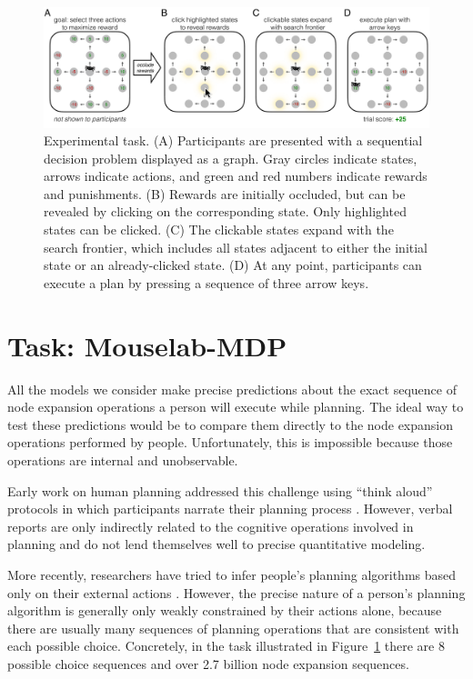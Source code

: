\begin{figure}[t!]
    \centering
    \includegraphics[width=\textwidth]{figs/planning/fig2.pdf}
    \caption{Experimental task.
    (A) Participants are presented with a sequential decision problem displayed as a graph. Gray circles indicate states, arrows indicate actions, and green and red numbers indicate rewards and punishments.
    (B) Rewards are initially occluded, but can be revealed by clicking on the corresponding state. Only highlighted states can be clicked.
    (C) The clickable states expand with the search frontier, which includes all states adjacent to either the initial state or an already-clicked state.
    (D) At any point, participants can execute a plan by pressing a sequence of three arrow keys.}
    \label{fig:planning-task}
\end{figure}


\section{Task: Mouselab-MDP}\label{sec:planning-task}
All the models we consider make precise predictions about the exact sequence of node expansion operations a person will execute while planning. The ideal way to test these predictions would be to compare them directly to the node expansion operations performed by people. Unfortunately, this is impossible because those operations are internal and unobservable.

Early work on human planning addressed this challenge using ``think aloud'' protocols in which participants narrate their planning process \citep{degroot1965thought,newell1972human,chase1973perception}. However, verbal reports are only indirectly related to the cognitive operations involved in planning and do not lend themselves well to precise quantitative modeling.

More recently, researchers have tried to infer people's planning algorithms based only on their external actions \citep{huys2012bonsai,huys2015interplay,daw2005uncertaintybased,solway2015evidence,snider2015prospective,vanopheusden2017computational}. However, the precise nature of a person's planning algorithm is generally only weakly constrained by their actions alone, because there are usually many sequences of planning operations that are consistent with each possible choice. Concretely, in the task illustrated in Figure~\ref{fig:planning-task} there are 8 possible choice sequences and over 2.7 billion node expansion sequences.

